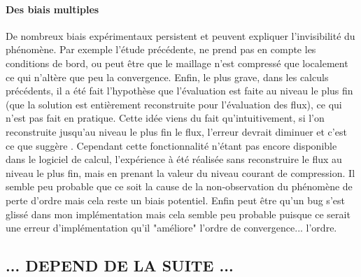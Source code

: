     \paragraph{Des biais multiples}
        De nombreux biais expérimentaux persistent et peuvent expliquer l'invisibilité du phénomène.
        Par exemple l'étude précédente, ne prend pas en compte les conditions de bord, ou peut être que le maillage n'est compressé que localement 
        ce qui n'altère que peu la convergence. Enfin, le plus grave, dans les calculs précédents, il a été fait l'hypothèse que l'évaluation est faite au niveau le plus fin 
        (que la solution est entièrement reconstruite pour l'évaluation des flux), ce qui n'est pas fait en pratique. Cette idée viens du fait qu'intuitivement, 
        si l'on reconstruite jusqu'au niveau le plus fin le flux, l'erreur devrait diminuer et c'est ce que suggère \cite{belloti_et_al_2025}.
        Cependant cette fonctionnalité n'étant pas encore disponible dans le logiciel de calcul, l'expérience à été réalisée sans reconstruire le flux au niveau 
        le plus fin, mais en prenant la valeur du niveau courant de compression. Il semble peu probable que ce soit la cause de la non-observation du phénomène 
        de perte d'ordre mais cela reste un biais potentiel. Enfin peut être qu'un bug s'est glissé dans mon implémentation mais cela semble peu probable 
        puisque ce serait une erreur d'implémentation qu'il "améliore" l'ordre de convergence... 
        l'ordre.
\subsection{... DEPEND DE LA SUITE ...}